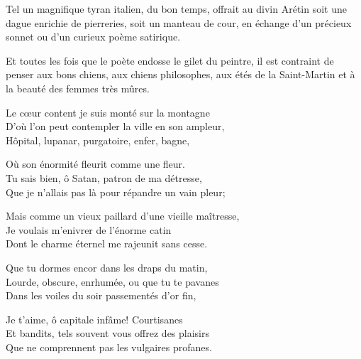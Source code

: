 Tel un magnifique tyran italien, du bon temps, offrait au divin Arétin
soit une dague enrichie de pierreries, soit un manteau de cour, en
échange d’un précieux sonnet ou d’un
curieux poème satirique.

Et toutes les fois que le poète endosse le gilet du peintre, il est
contraint de penser aux bons chiens, aux chiens philosophes, aux étés
de la Saint{}-Martin et à la beauté des femmes très mûres.


\bigskip

\noindent Le cœur content je suis monté sur la montagne\\
D'où l'on peut contempler la ville en son ampleur,\\
Hôpital, lupanar, purgatoire, enfer, bagne,\\\medskip

 \noindent Où son énormité fleurit comme une fleur.\\
Tu sais bien, ô Satan, patron de ma détresse,\\
Que je n'allais pas là pour répandre un vain pleur;\\\medskip

 \noindent Mais comme un vieux paillard d'une vieille maîtresse,\\
Je voulais m'enivrer de l'énorme catin\\
Dont le charme éternel me rajeunit sans cesse.\\\medskip

 \noindent Que tu dormes encor dans les draps du matin,\\
Lourde, obscure, enrhumée, ou que tu te pavanes\\
Dans les voiles du soir passementés d'or fin,\\\medskip

 \noindent Je t'aime, ô capitale infâme! Courtisanes\\
Et bandits, tels souvent vous offrez des plaisirs\\
Que ne comprennent pas les vulgaires profanes.\\
\vfil

\setcounter{secnumdepth}{0} %
